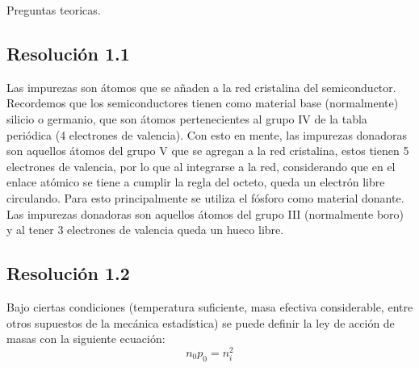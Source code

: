 \documentclass[
  11pt,
  letterpaper,
   addpoints,
   answers
  ]{exam}
\begin{document}
\begin{questions}
    \question Preguntas teoricas.

\begin{solution}
\subsection*{Resolución 1.1}
Las impurezas son átomos que se añaden a la red cristalina del semiconductor. Recordemos que los semiconductores tienen como material base (normalmente) silicio o germanio, que son átomos pertenecientes al grupo IV de la tabla periódica (4 electrones de valencia). Con esto en mente, las impurezas donadoras son aquellos átomos del grupo V que se agregan a la red cristalina, estos tienen 5 electrones de valencia, por lo que al integrarse a la red, considerando que en el enlace atómico se tiene a cumplir la regla del octeto, queda un electrón libre circulando. Para esto principalmente se utiliza el fósforo como material donante. Las impurezas donadoras son aquellos átomos del grupo III (normalmente boro) y al tener 3 electrones de valencia queda un hueco libre.

\subsection*{Resolución 1.2}
Bajo ciertas condiciones (temperatura suficiente, masa efectiva considerable, entre otros supuestos de la mecánica estadística) se puede definir la ley de acción de masas con la siguiente ecuación:
$$n_0 p_0 = n_i^2$$


\end{solution}
\end{questions}
\end{document}
